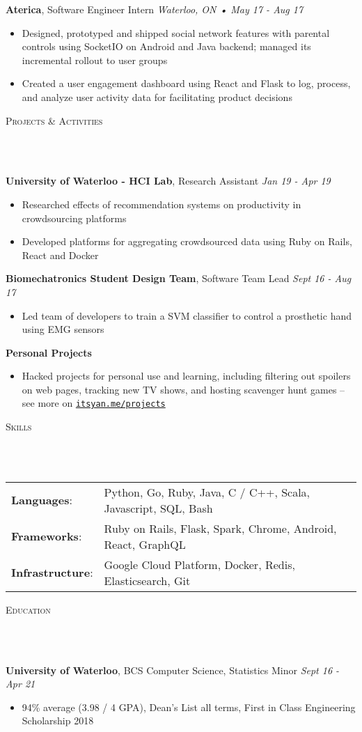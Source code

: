 \documentclass[a4paper, 11pt, hidelinks]{article}
\newcommand{\lineunder} {
    \vspace*{-8pt} \\
    \hrulefill \\
}
\newcommand{\header} [1] {
    \color{bigtext}
    {\hspace*{-4pt}\vspace*{6pt} \textsc{#1}}
    \vspace*{-6pt}
    \color{bodytext}
    \lineunder
    \vspace{6pt}
}
\newcommand{\jobheader} [4] {
    \color{bigtext}\textbf{#1}, #2 \color{weaktext}\hfill\textit{#3 • #4}\\
    \vspace{-1mm} \color{bodytext}
}
\newcommand{\nolocheader} [3] {
    \color{bigtext}\textbf{#1}, #2 \color{weaktext}\hfill\textit{#3}\\
    \vspace{-1mm} \color{bodytext}
}
\newcommand{\minheader} [1] {
    \color{bigtext}\textbf{#1}\hfill\\
    \vspace{-1mm} \color{bodytext}
}
\begin{document}
\jobheader{Aterica}{Software Engineer Intern}{Waterloo, ON}{May 17 - Aug 17}
\begin{itemize}[leftmargin=2em] \itemsep 1pt \color{bodytext}
	\item Designed, prototyped and shipped social network features with parental controls using SocketIO on
    Android and Java backend; managed its incremental rollout to user groups
	\item Created a user engagement dashboard using React and Flask to log, process, and analyze user activity
    data for facilitating product decisions
\end{itemize}

\header{Projects \& Activities}
\nolocheader{University of Waterloo - HCI Lab}{Research Assistant}{Jan 19 - Apr 19}
\begin{itemize}[leftmargin=2em] \itemsep 1pt \color{bodytext}
    \item Researched effects of recommendation systems on productivity in crowdsourcing platforms
    \item Developed platforms for aggregating crowdsourced data using Ruby on Rails, React and Docker
\end{itemize}

\nolocheader{Biomechatronics Student Design Team}{Software Team Lead}{Sept 16 - Aug 17}
\begin{itemize}[leftmargin=2em] \itemsep 1pt \color{bodytext}
    \item Led team of developers to train a SVM classifier to control a prosthetic hand using EMG sensors
\end{itemize}

\minheader{Personal Projects}
\begin{itemize}[leftmargin=2em] \itemsep 1pt \color{bodytext}
    \item Hacked projects for personal use and learning, including filtering out
    spoilers on web pages, tracking new TV shows, and hosting scavenger hunt games -- see more on
    \texttt{\href{http://www.itsyan.me/projects}{itsyan.me/projects}}
\end{itemize}

\header{Skills}
\hspace{-10pt}
\begin{tabular}{ l l }
    \color{bigtext}\textbf{Languages}:\color{bodytext} & Python, Go, Ruby, Java, C / C++, Scala, Javascript, SQL, Bash \\[2pt]
    \color{bigtext}\textbf{Frameworks}:\color{bodytext} & Ruby on Rails, Flask, Spark, Chrome, Android, React, GraphQL \\[2pt]
    \color{bigtext}\textbf{Infrastructure}:\color{bodytext} & Google Cloud Platform, Docker, Redis, Elasticsearch, Git
\end{tabular}
\vspace{3mm}

\header{Education}
\nolocheader{University of Waterloo}{BCS Computer Science, Statistics Minor}{Sept 16 - Apr 21}
\begin{itemize}[leftmargin=2em] \itemsep 1pt
	\item 94\% average (3.98 / 4 GPA), Dean's List all terms, First in Class Engineering Scholarship 2018
\end{itemize}
\end{document}
